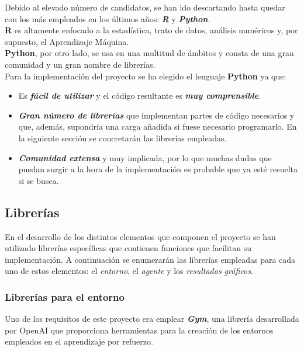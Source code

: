 Debido al elevado número de candidatos, se han ido descartando hasta quedar con los más empleados en los últimos años: \textbf{\textit{R}} y \textbf{\textit{Python}}. \\

\textbf{R} es altamente enfocado a la estadística, trato de datos, análisis numéricos y, por supuesto, el Aprendizaje Máquina. \\

\textbf{Python}, por otro lado, se usa en una multitud de ámbitos y consta de una gran comunidad y un gran nombre de librerías. \\

Para la implementación del proyecto se ha elegido el lenguaje \textbf{Python} ya que:

\begin{itemize}
    \item Es \textbf{\textit{fácil de utilizar}} y el código resultante es \textbf{\textit{muy comprensible}}.
    \item \textbf{\textit{Gran número de librerías}} que implementan partes de código necesarios y que, además, supondría una carga añadida si fuese necesario programarlo. En la siguiente sección se concretarán las librerías empleadas.  
    \item \textbf{\textit{Comunidad extensa}} y muy implicada, por lo que muchas dudas que puedan surgir a la hora de la implementación es probable que ya esté resuelta si se busca.
\end{itemize}

\subsection{Librerías} 

En el desarrollo de los distintos elementos que componen el proyecto se han utilizado librerías específicas que contienen funciones que facilitan su implementación. A continuación se enumerarán las librerías empleadas para cada uno de estos elementos: el \textit{entorno}, el \textit{agente} y los \textit{resultados gráficos}. 

\subsubsection{Librerías para el entorno}

Uno de los requisitos de este proyecto era emplear \textbf{\textit{Gym}}, una librería desarrollada por OpenAI que proporciona herramientas para la creación de los entornos empleados en el aprendizaje por refuerzo. \\

